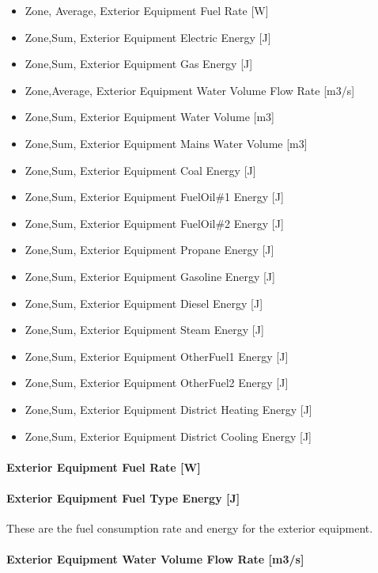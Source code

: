 \begin{itemize}
\item
  Zone, Average, Exterior Equipment Fuel Rate {[}W{]}
\item
  Zone,Sum, Exterior Equipment Electric Energy {[}J{]}
\item
  Zone,Sum, Exterior Equipment Gas Energy {[}J{]}
\item
  Zone,Average, Exterior Equipment Water Volume Flow Rate {[}m3/s{]}
\item
  Zone,Sum, Exterior Equipment Water Volume {[}m3{]}
\item
  Zone,Sum, Exterior Equipment Mains Water Volume {[}m3{]}
\item
  Zone,Sum, Exterior Equipment Coal Energy {[}J{]}
\item
  Zone,Sum, Exterior Equipment FuelOil\#1 Energy {[}J{]}
\item
  Zone,Sum, Exterior Equipment FuelOil\#2 Energy {[}J{]}
\item
  Zone,Sum, Exterior Equipment Propane Energy {[}J{]}
\item
  Zone,Sum, Exterior Equipment Gasoline Energy {[}J{]}
\item
  Zone,Sum, Exterior Equipment Diesel Energy {[}J{]}
\item
  Zone,Sum, Exterior Equipment Steam Energy {[}J{]}
\item
  Zone,Sum, Exterior Equipment OtherFuel1 Energy {[}J{]}
\item
  Zone,Sum, Exterior Equipment OtherFuel2 Energy {[}J{]}
\item
  Zone,Sum, Exterior Equipment District Heating Energy {[}J{]}
\item
  Zone,Sum, Exterior Equipment District Cooling Energy {[}J{]}
\end{itemize}

\paragraph{Exterior Equipment Fuel Rate {[}W{]}}\label{exterior-equipment-fuel-rate-w}

\paragraph{Exterior Equipment Fuel Type Energy {[}J{]}}\label{exterior-equipment-fuel-type-energy-j}

These are the fuel consumption rate and energy for the exterior equipment.

\paragraph{Exterior Equipment Water Volume Flow Rate {[}m3/s{]}}\label{exterior-equipment-water-volume-flow-rate-m3s}

